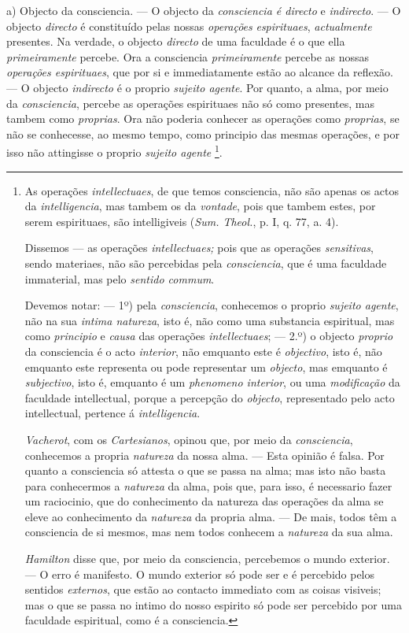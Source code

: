 a) Objecto da consciencia. --- O objecto da \emph{consciencia é directo} e \emph{indirecto}. --- O objecto \emph{directo} é constituído pelas nossas \emph{operações}  \emph{ espirituaes}, \emph{actualmente} presentes. Na verdade, o objecto \emph{directo} de uma faculdade é o que ella \emph{primeiramente} percebe. Ora a consciencia \emph{primeiramente} percebe as nossas \emph{operações espirituaes}, que por si e immediatamente estão ao alcance da reflexão. --- O objecto \emph{indirecto} é o proprio \emph{sujeito agente}. Por quanto, a alma, por meio da \emph{consciencia}, percebe as operações espirituaes não só como presentes, mas tambem como \emph{proprias}. Ora não poderia conhecer as operações como \emph{proprias}, se não se conhecesse, ao mesmo tempo, como principio das mesmas operações, e por isso não attingisse o proprio \emph{sujeito agente} \footnote{As operações \emph{intellectuaes}, de que temos consciencia, não são apenas os actos da \emph{intelligencia}, mas tambem os da \emph{vontade}, pois que tambem estes, por serem espirituaes, são intelligiveis (\emph{Sum. Theol.}, p. I, q. 77, a. 4).\par Dissemos --- as operações \emph{intellectuaes;} pois que as operações \emph{sensitivas}, sendo materiaes, não são percebidas pela \emph{consciencia}, que é uma faculdade immaterial, mas pelo \emph{sentido commum}.\par Devemos notar: --- 1º) pela \emph{consciencia}, conhecemos o proprio \emph{sujeito agente}, não na sua \emph{intima natureza}, isto é, não como uma substancia espiritual, mas como \emph{principio} e \emph{causa} das operações \emph{intellectuaes}; --- 2.º) o objecto \emph{proprio} da consciencia é o acto \emph{interior}, não emquanto este é \emph{objectivo}, isto é, não emquanto este representa ou pode representar um \emph{objecto}, mas emquanto é \emph{subjectivo}, isto é, emquanto é um \emph{phenomeno interior}, ou uma \emph{modificação} da faculdade intellectual, porque a percepção do \emph{objecto}, representado pelo acto intellectual, pertence á \emph{intelligencia}.\par \emph{Vacherot}, com os \emph{Cartesianos}, opinou que, por meio da \emph{consciencia}, conhecemos a propria \emph{natureza} da nossa alma. --- Esta opinião é falsa. Por quanto a consciencia só attesta o que se passa na alma; mas isto não basta para conhecermos a \emph{natureza} da alma, pois que, para isso, é necessario fazer um raciocinio, que do conhecimento da natureza das operações da alma se eleve ao conhecimento da \emph{natureza} da propria alma. --- De mais, todos têm a consciencia de si mesmos, mas nem todos conhecem a \emph{natureza} da sua alma.\par \emph{Hamilton} disse que, por meio da consciencia, percebemos o mundo exterior. --- O erro é manifesto. O mundo exterior só pode ser e é percebido pelos sentidos \emph{externos}, que estão ao contacto immediato com as coisas visiveis; mas o que se passa no intimo do nosso espirito só pode ser percebido por uma faculdade espiritual, como é a consciencia.}.

